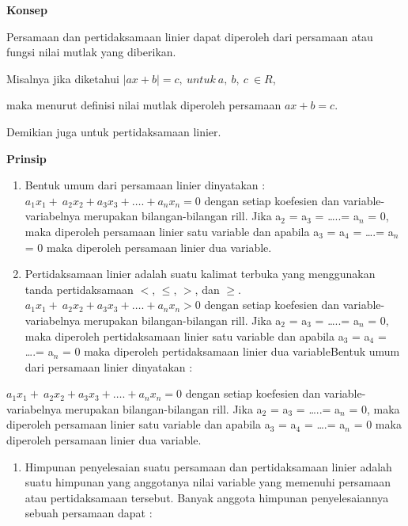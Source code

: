 \documentclass[11pt,fleqn]{book} %
\begin{document}
\textbf{Konsep}

\noindent Persamaan dan pertidaksamaan linier dapat diperoleh dari persamaan atau fungsi nilai mutlak yang diberikan. 

\noindent Misalnya jika diketahui $\left|ax+b\right|=c,\ untuk\ a,\ b,\ c\ \in R$, 

\noindent maka menurut definisi nilai mutlak  diperoleh persamaan $ax+b=c.$ 

\noindent Demikian juga untuk pertidaksamaan linier.

\noindent \textbf{Prinsip}

\begin{enumerate}
\item \textbf{ }Bentuk umum dari persamaan linier dinyatakan : $a_1x_1+\ a_2x_2+a_3x_3+\dots .+a_nx_n=0$ dengan setiap koefesien dan variable-variabelnya merupakan bilangan-bilangan rill. Jika a${}_{2}$ = a${}_{3}$ = {\dots}..= a${}_{n}$ = 0, maka diperoleh persamaan linier satu variable dan apabila a${}_{3}$ = a${}_{4}$ = {\dots}.= a${}_{n}$ = 0 maka diperoleh persamaan linier dua variable. 

\item  Pertidaksamaan linier adalah suatu  kalimat terbuka yang menggunakan tanda pertidaksamaan $<$, $\mathrm{\le}$, $>$, dan  $\mathrm{\ge}$. $a_1x_1+\ a_2x_2+a_3x_3+\dots .+a_nx_n>0$ dengan setiap koefesien dan variable- variabelnya merupakan bilangan-bilangan rill. Jika a${}_{2}$ = a${}_{3}$ = {\dots}..= a${}_{n}$ = 0, maka diperoleh pertidaksamaan linier satu variable dan apabila a${}_{3}$ = a${}_{4}$ = {\dots}.= a${}_{n}$ = 0 maka diperoleh pertidaksamaan linier dua variableBentuk umum dari persamaan linier dinyatakan : 
\end{enumerate}

\noindent $a_1x_1+\ a_2x_2+a_3x_3+\dots .+a_nx_n=0$ dengan setiap koefesien dan variable-variabelnya merupakan bilangan-bilangan rill. Jika a${}_{2}$ = a${}_{3}$ = {\dots}..= a${}_{n}$ = 0, maka diperoleh persamaan linier satu variable dan apabila a${}_{3}$ = a${}_{4}$ = {\dots}.= a${}_{n}$ = 0 maka diperoleh persamaan linier dua variable.

\begin{enumerate}
\item  Himpunan penyelesaian suatu persamaan dan pertidaksamaan linier adalah suatu himpunan yang anggotanya nilai variable yang memenuhi persamaan atau pertidaksamaan tersebut. Banyak anggota himpunan penyelesaiannya sebuah persamaan dapat :
\end{enumerate}
\end{document}

